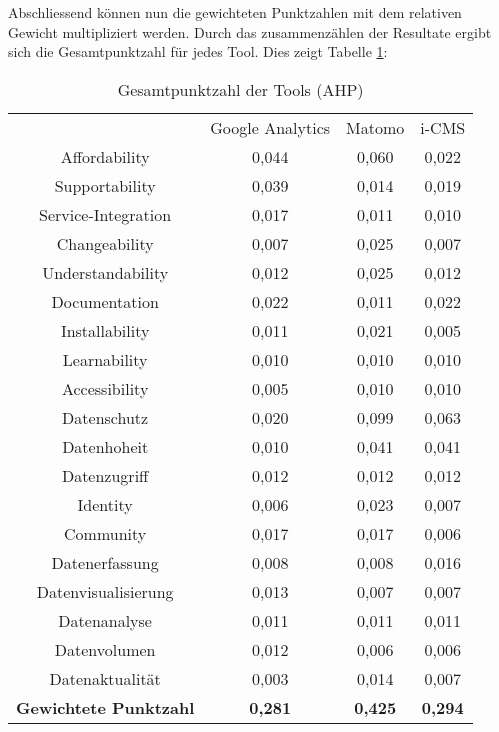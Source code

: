       \newpage
      Abschliessend können nun die gewichteten Punktzahlen mit dem relativen Gewicht multipliziert werden. Durch das zusammenzählen der Resultate ergibt sich die Gesamtpunktzahl für jedes Tool. Dies zeigt Tabelle \ref{tab:gewPunkt}:
      \begin{table}[h]
        \centering
        \begin{tabular}{cccc}
          & Google Analytics & Matomo & i-CMS \\
          Affordability & 0,044 & 0,060 & 0,022 \\
          Supportability & 0,039 & 0,014 & 0,019 \\
          Service-Integration & 0,017 & 0,011 & 0,010 \\
          Changeability & 0,007 & 0,025 & 0,007 \\
          Understandability & 0,012 & 0,025 & 0,012 \\
          Documentation & 0,022 & 0,011 & 0,022 \\
          Installability & 0,011 & 0,021 & 0,005 \\
          Learnability & 0,010 & 0,010 & 0,010 \\
          Accessibility & 0,005 & 0,010 & 0,010 \\
          Datenschutz & 0,020 & 0,099 & 0,063 \\
          Datenhoheit & 0,010 & 0,041 & 0,041 \\
          Datenzugriff & 0,012 & 0,012 & 0,012 \\
          Identity & 0,006 & 0,023 & 0,007 \\
          Community & 0,017 & 0,017 & 0,006 \\
          Datenerfassung & 0,008 & 0,008 & 0,016 \\
          Datenvisualisierung & 0,013 & 0,007 & 0,007 \\
          Datenanalyse & 0,011 & 0,011 & 0,011 \\
          Datenvolumen & 0,012 & 0,006 & 0,006 \\
          Datenaktualität & 0,003 & 0,014 & 0,007 \\
          \textbf{Gewichtete Punktzahl} & \textbf{0,281} & \textbf{0,425} & \textbf{0,294} \\
          \end{tabular} 
        \caption{Gesamtpunktzahl der Tools (AHP)}
        \label{tab:gewPunkt}
        \end{table}


